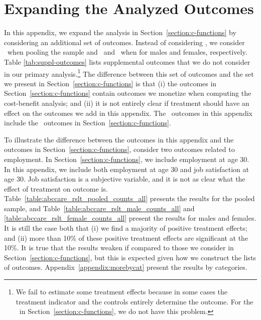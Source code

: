 \section{Expanding the Analyzed Outcomes} \label{appendix:moreoutcomes}

\noindent In this appendix, we expand the analysis in Section~\ref{section:c-functions} by considering an additional set of outcomes. Instead of considering \noutcomes, we consider \noutcomesexpp\ when pooling the sample and \noutcomesexpm\ and \noutcomesexpf\ when for males and females, respectively. Table \ref{tab:suppl-outcomes} lists supplemental outcomes that we do not consider in our primary analysis.\footnote{We fail to estimate some treatment effects because in some cases the treatment indicator and the controls entirely determine the outcome. For the \noutcomes\ in Section~\ref{section:c-functions}, we do not have this problem.} The difference between this set of outcomes and the set we present in Section~\ref{section:c-functions} is that (i) the outcomes in Section~\ref{section:c-functions} contain outcomes we monetize when computing the cost-benefit analysis; and (ii) it is not entirely clear if treatment should have an effect on the outcomes we add in this appendix. The \noutcomesexpp\ outcomes in this appendix include the \noutcomes\ outcomes in Section~\ref{section:c-functions}.\\

\singlespacing

\doublespacing

\noindent To illustrate the difference between the outcomes in this appendix and the outcomes in Section~\ref{section:c-functions}, consider two outcomes related to employment. In Section~\ref{section:c-functions}, we include employment at age 30. In this appendix, we include both employment at age 30 and job satisfaction at age 30. Job satisfaction is a subjective variable, and it is not as clear what the effect of treatment on outcome is.\\

\noindent Table~\ref{table:abccare_rslt_pooled_counts_all} presents the results for the pooled sample, and Table~\ref{table:abccare_rslt_male_counts_all} and \ref{table:abccare_rslt_female_counts_all} present the results for males and females. It is still the case both that (i) we find a majority of positive treatment effects; and (ii) more than 10\% of these positive treatment effects are significant at the 10\%. It is true that the results weaken if compared to those we consider in Section~\ref{section:c-functions}, but this is expected given how we construct the lists of outcomes. Appendix~\ref{appendix:morebycat} present the results by categories.


